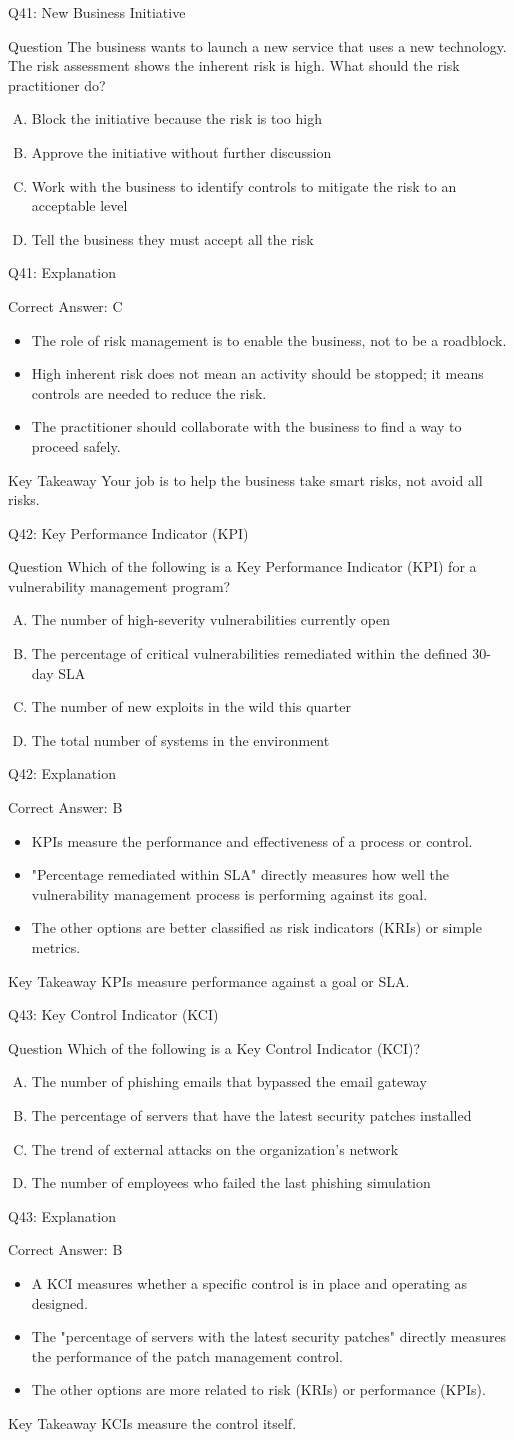 \documentclass[aspectratio=169]{beamer}
\newcommand{\hq}[7]{%
	\begin{frame}{Q#1: #2}
		\begin{block}{Question}
			#3
		\end{block}
		\begin{enumerate}[(A)]
			#4
		\end{enumerate}
	\end{frame}
	\begin{frame}{Q#1: Explanation}
		\begin{block}{Correct Answer: #5}
			\begin{itemize}
				#6
			\end{itemize}
		\end{block}
		\begin{alertblock}{Key Takeaway}
			#7
		\end{alertblock}
	\end{frame}
}
\begin{document}
	\hq{41}{New Business Initiative}
	{The business wants to launch a new service that uses a new technology. The risk assessment shows the inherent risk is high. What should the risk practitioner do?}
	{\item Block the initiative because the risk is too high
		\item Approve the initiative without further discussion
		\item Work with the business to identify controls to mitigate the risk to an acceptable level
		\item Tell the business they must accept all the risk}
	{C}
	{\item The role of risk management is to enable the business, not to be a roadblock.
		\item High inherent risk does not mean an activity should be stopped; it means controls are needed to reduce the risk.
		\item The practitioner should collaborate with the business to find a way to proceed safely.}
	{Your job is to help the business take smart risks, not avoid all risks.}
	
	\hq{42}{Key Performance Indicator (KPI)}
	{Which of the following is a Key Performance Indicator (KPI) for a vulnerability management program?}
	{\item The number of high-severity vulnerabilities currently open
		\item The percentage of critical vulnerabilities remediated within the defined 30-day SLA
		\item The number of new exploits in the wild this quarter
		\item The total number of systems in the environment}
	{B}
	{\item KPIs measure the performance and effectiveness of a process or control.
		\item "Percentage remediated within SLA" directly measures how well the vulnerability management process is performing against its goal.
		\item The other options are better classified as risk indicators (KRIs) or simple metrics.}
	{KPIs measure performance against a goal or SLA.}
	
	\hq{43}{Key Control Indicator (KCI)}
	{Which of the following is a Key Control Indicator (KCI)?}
	{\item The number of phishing emails that bypassed the email gateway
		\item The percentage of servers that have the latest security patches installed
		\item The trend of external attacks on the organization's network
		\item The number of employees who failed the last phishing simulation}
	{B}
	{\item A KCI measures whether a specific control is in place and operating as designed.
		\item The "percentage of servers with the latest security patches" directly measures the performance of the patch management control.
		\item The other options are more related to risk (KRIs) or performance (KPIs).}
	{KCIs measure the control itself.}
	
\end{document}
